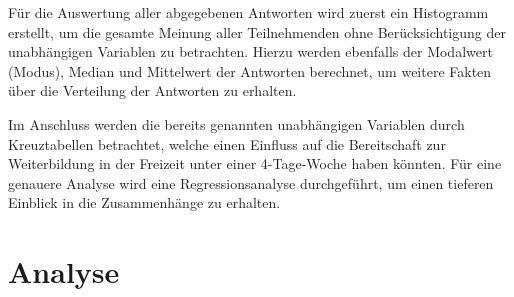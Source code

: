 Für die Auswertung aller abgegebenen Antworten wird zuerst ein Histogramm erstellt, um die gesamte Meinung
aller Teilnehmenden ohne Berücksichtigung der unabhängigen Variablen zu betrachten.
Hierzu werden ebenfalls der Modalwert (Modus), Median und Mittelwert der Antworten berechnet, um weitere
Fakten über die Verteilung der Antworten zu erhalten.

Im Anschluss werden die bereits genannten unabhängigen Variablen durch Kreuztabellen betrachtet, 
welche einen Einfluss auf die Bereitschaft zur Weiterbildung in der Freizeit unter einer 4-Tage-Woche 
haben könnten. 
Für eine genauere Analyse wird eine Regressionsanalyse durchgeführt, 
um einen tieferen Einblick in die Zusammenhänge zu erhalten. %














\section{Analyse}




